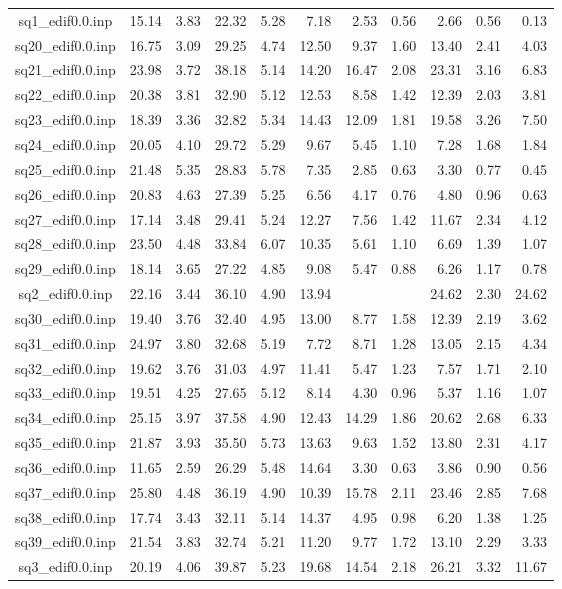 {\begin{longtable}{@{}cr@{\hspace{1em}}r@{\hspace{1em}}r@{\hspace{1em}}r@{\hspace{1em}}r@{\hspace{2em}}r@{\hspace{1em}}r@{\hspace{1em}}r@{\hspace{1em}}r@{\hspace{1em}}r@{}}
sq1\_edif0.0.inp&15.14&3.83&22.32&5.28&7.18&2.53&0.56&2.66&0.56&0.13\\
sq20\_edif0.0.inp&16.75&3.09&29.25&4.74&12.50&9.37&1.60&13.40&2.41&4.03\\
sq21\_edif0.0.inp&23.98&3.72&38.18&5.14&14.20&16.47&2.08&23.31&3.16&6.83\\
sq22\_edif0.0.inp&20.38&3.81&32.90&5.12&12.53&8.58&1.42&12.39&2.03&3.81\\
sq23\_edif0.0.inp&18.39&3.36&32.82&5.34&14.43&12.09&1.81&19.58&3.26&7.50\\
sq24\_edif0.0.inp&20.05&4.10&29.72&5.29&9.67&5.45&1.10&7.28&1.68&1.84\\
sq25\_edif0.0.inp&21.48&5.35&28.83&5.78&7.35&2.85&0.63&3.30&0.77&0.45\\
sq26\_edif0.0.inp&20.83&4.63&27.39&5.25&6.56&4.17&0.76&4.80&0.96&0.63\\
sq27\_edif0.0.inp&17.14&3.48&29.41&5.24&12.27&7.56&1.42&11.67&2.34&4.12\\
sq28\_edif0.0.inp&23.50&4.48&33.84&6.07&10.35&5.61&1.10&6.69&1.39&1.07\\
sq29\_edif0.0.inp&18.14&3.65&27.22&4.85&9.08&5.47&0.88&6.26&1.17&0.78\\
sq2\_edif0.0.inp&22.16&3.44&36.10&4.90&13.94&&&24.62&2.30&24.62\\
sq30\_edif0.0.inp&19.40&3.76&32.40&4.95&13.00&8.77&1.58&12.39&2.19&3.62\\
sq31\_edif0.0.inp&24.97&3.80&32.68&5.19&7.72&8.71&1.28&13.05&2.15&4.34\\
sq32\_edif0.0.inp&19.62&3.76&31.03&4.97&11.41&5.47&1.23&7.57&1.71&2.10\\
sq33\_edif0.0.inp&19.51&4.25&27.65&5.12&8.14&4.30&0.96&5.37&1.16&1.07\\
sq34\_edif0.0.inp&25.15&3.97&37.58&4.90&12.43&14.29&1.86&20.62&2.68&6.33\\
sq35\_edif0.0.inp&21.87&3.93&35.50&5.73&13.63&9.63&1.52&13.80&2.31&4.17\\
sq36\_edif0.0.inp&11.65&2.59&26.29&5.48&14.64&3.30&0.63&3.86&0.90&0.56\\
sq37\_edif0.0.inp&25.80&4.48&36.19&4.90&10.39&15.78&2.11&23.46&2.85&7.68\\
sq38\_edif0.0.inp&17.74&3.43&32.11&5.14&14.37&4.95&0.98&6.20&1.38&1.25\\
sq39\_edif0.0.inp&21.54&3.83&32.74&5.21&11.20&9.77&1.72&13.10&2.29&3.33\\
sq3\_edif0.0.inp&20.19&4.06&39.87&5.23&19.68&14.54&2.18&26.21&3.32&11.67\\

\end{longtable}}
